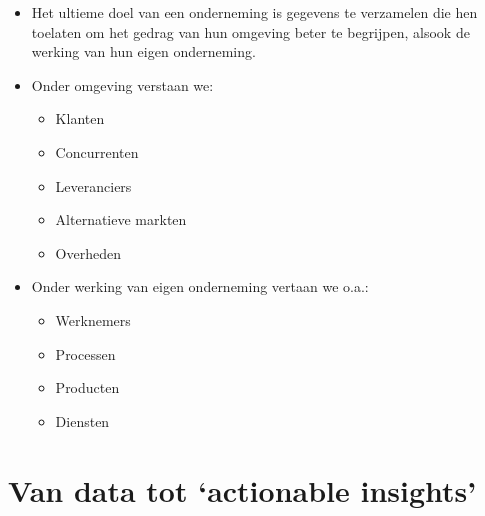 \documentclass[]{memoir}
\providecommand{\tightlist}{%
  \setlength{\itemsep}{0pt}\setlength{\parskip}{0pt}}
\begin{document}
\begin{itemize}
\tightlist
\item
  Het ultieme doel van een onderneming is gegevens te verzamelen die hen
  toelaten om het gedrag van hun omgeving beter te begrijpen, alsook de
  werking van hun eigen onderneming.
\item
  Onder omgeving verstaan we:

  \begin{itemize}
  \tightlist
  \item
    Klanten
  \item
    Concurrenten
  \item
    Leveranciers
  \item
    Alternatieve markten
  \item
    Overheden
  \end{itemize}
\item
  Onder werking van eigen onderneming vertaan we o.a.:

  \begin{itemize}
  \tightlist
  \item
    Werknemers
  \item
    Processen
  \item
    Producten
  \item
    Diensten
  \end{itemize}
\end{itemize}

\section{\texorpdfstring{Van data tot `actionable
insights'}{Van data tot actionable insights}}\label{van-data-tot-actionable-insights}
\end{document}
